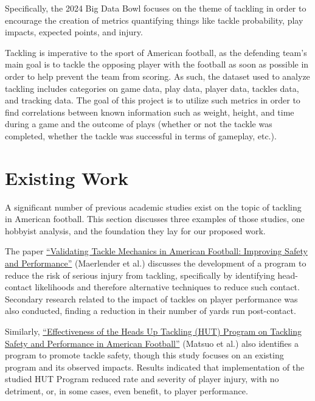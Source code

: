 \documentclass[bibtex, sigconf, hyperref={colorlinks=true,linkcolor=blue,urlcolor=blue}]{acmart}
\begin{document}
Specifically, the 2024 Big Data Bowl focuses on the theme of tackling in order
to encourage the creation of metrics quantifying things like tackle probability,
play impacts, expected points, and injury.

Tackling is imperative to the sport of American football, as the defending
team's main goal is to tackle the opposing player with the football as soon as
possible in order to help prevent the team from scoring. As such, the dataset
used to analyze tackling includes categories on game data, play data, player
data, tackles data, and tracking data. The goal of this project is to utilize
such metrics in order to find correlations between known information such as
weight, height, and time during a game and the outcome of plays (whether or not
the tackle was completed, whether the tackle was successful in terms of
gameplay, etc.).

\section{Existing Work}

A significant number of previous academic studies exist on the topic of tackling
in American football. This section discusses three examples of those studies,
one hobbyist analysis, and the foundation they lay for our proposed work.

The paper
\href{https://link.springer.com/article/10.1007/s10439-020-02625-7}{“Validating
Tackle Mechanics in American Football: Improving Safety and
Performance”}\cite{validatingtackles} (Maerlender et al.) discusses the
development of a program to reduce the risk of serious injury from tackling,
specifically by identifying head-contact likelihoods and therefore alternative
techniques to reduce such contact. Secondary research related to the impact of
tackles on player performance was also conducted, finding a reduction in their
number of yards run post-contact.

Similarly,
\href{https://www.jstage.jst.go.jp/article/ijshs/16/0/16_201804/_article/-char/ja/}
{“Effectiveness of the Heads Up Tackling (HUT) Program on Tackling Safety and
Performance in American Football”}\cite{effectiveness} (Matsuo et al.) also
identifies a program to promote tackle safety, though this study focuses on an
existing program and its observed impacts. Results indicated that implementation
of the studied HUT Program reduced rate and severity of player injury, with no
detriment, or, in some cases, even benefit, to player performance.
\end{document}
